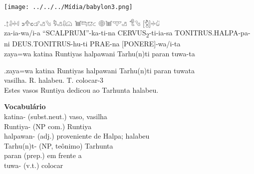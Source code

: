 \clearpage

\begin{center}
	\texttt{[image: ../../../Mídia/babylon3.png]}
\end{center}
\exg.{\Large 𔖪𔓱𔗬𔗷} {\Large 𔗎𔔯𔗏𔗧𔑣𔐤} {\Large 𔑵𔑣𔓱𔗔} {\Large 𔓢𔑞𔕸𔗐} {\Large 𔖖𔓢𔕙𔑣}
{\Large 𔐎𔐤} {\Large [𔑇]𔗬𔑰}\\
za-ia-wa\slash{}i-a\hspace{10pt} ``SCALPRUM''-ka-ti-na\hspace{10pt}
CERVUS\textsubscript{2}-ti-ia-sa\hspace{10pt} TONITRUS.HALPA-pa-ni\hspace{10pt}
DEUS.TONITRUS-hu-ti\hspace{10pt} PRAE-na\hspace{10pt} [PONERE]-wa/i-ta\\
zaya=wa katina Runtiyas halpawani Tarhu{(n)}ti paran tuwa-ta

\exg.zaya=wa katina Runtiyas halpawani Tarhu{(n)}ti paran tuwata\\
\Det{}\Acu{}\Pl{} vasilha.\Neut{}\Acu{}\Pl{} R.\Com{}\Nom{}\Sg{} halabeu.\Com{}\Dat{}\Sg{} T.\Com{}\Dat{}\Sg{} \Prep{} colocar-3\Sg\\
Estes vasos Runtiya dedicou ao Tarhunta halabeu.

\vspace{1cm}
\noindent\textbf{Vocabulário}\\
\noindent katina- (subst.neut.) vaso, vasilha\\
Runtiya- (NP com.) Runtiya\\
halpawan- (adj.) proveniente de Halpa; halabeu\\
Tarhu{(n)}t- (NP, teônimo) Tarhunta\\
paran (prep.) em frente a\\
tuwa- (v.t.) colocar
